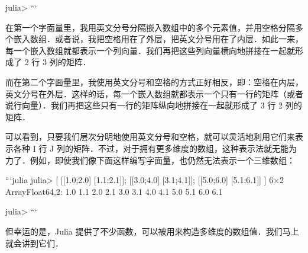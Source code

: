 julia> 
```

在第一个字面量里，我用英文分号分隔嵌入数组中的多个元素值，并用空格分隔多个嵌入数组．或者说，我把空格用在了外层，把英文分号用在了内层．如此一来，每一个嵌入数组就都表示一个列向量．我们再把这些列向量横向地拼接在一起就形成了 2 行 3 列的矩阵．

而在第二个字面量里，我使用英文分号和空格的方式正好相反，即：空格在内层，英文分号在外层．这样的话，每一个嵌入数组就都表示一个只有一行的矩阵（或者说行向量）．我们再把这些只有一行的矩阵纵向地拼接在一起就形成了 3 行 2 列的矩阵．

可以看到，只要我们层次分明地使用英文分号和空格，就可以灵活地利用它们来表示各种 I 行 J 列的矩阵．不过，对于拥有更多维度的数组，这种表示法就无能为力了．例如，即使我们像下面这样编写字面量，也仍然无法表示一个三维数组：

```julia
julia> [ [[1.0;2.0] [1.1;2.1]]; [[3.0;4.0] [3.1;4.1]]; [[5.0;6.0] [5.1;6.1]] ]
6×2 Array{Float64,2}:
 1.0  1.1
 2.0  2.1
 3.0  3.1
 4.0  4.1
 5.0  5.1
 6.0  6.1

julia> 
```

但幸运的是，Julia 提供了不少函数，可以被用来构造多维度的数组值．我们马上就会讲到它们．